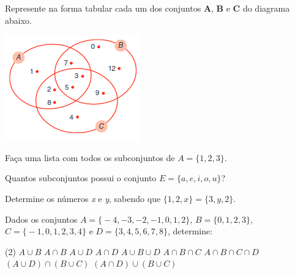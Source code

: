 \documentclass[10pt,a4paper]{article}
\begin{document}



	\begin{multicols}{2}

	  \setlength\columnseprule{0.6pt} %

    \begin{question}[type=exam]
      Represente na forma tabular cada um dos conjuntos \textbf{A}, \textbf{B} e \textbf{C} do diagrama abaixo.
      \begin{Figure}
        \centering
        \includegraphics[scale=1]{figures/q1.png}
      \end{Figure}

    \end{question}
    
    \begin{question}[type=exam]
      Faça uma lista com todos os subconjuntos de $A = \big\{1,2,3\big\}$. 
    \end{question}

    \begin{question}[type=exam]
      Quantos subconjuntos possui o conjunto $E = \big\{a,e,i,o,u\big\}$?
    \end{question}

    \begin{question}[type=exam]
      Determine os números \textit{x} e \textit{y}, sabendo que $\big\{1,2,x\big\} = \big\{3,y,2\big\}$.
    \end{question}

    \begin{question}[type=exam]
      Dados os conjuntos $A = \big\{-4,-3,-2,-1,0,1,2\big\}$, $B = \big\{0,1,2,3\big\}$, $C = \big\{-1,0,1,2,3,4\big\}$ e $D = \big\{3,4,5,6,7,8\big\}$, determine:
      \begin{tasks}(2)
        \task $A \cup B$
        \task $A \cap B$
        \task $A \cup D$
        \task $A \cap D$
        \task $A \cup B \cup D$
        \task $A \cap B \cap C$
        \task $A \cap B \cap C \cap D$
        \task $(A \cup D) \cap (B \cup C)$
        \task $(A \cap D) \cup (B \cup C)$
      \end{tasks}
    \end{question}


\end{multicols}
\end{document}
